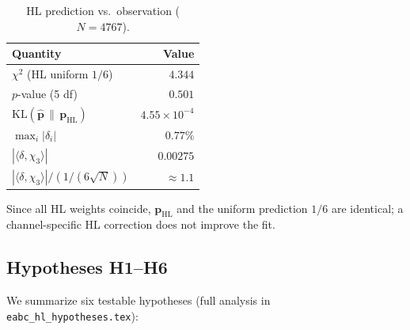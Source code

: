 \documentclass[11pt,a4paper]{article}
\begin{document}
\begin{table}[ht]
\centering
\caption{HL prediction vs.\ observation ($N=4767$).}
\label{tab:hl-goodness}
\begin{tabular}{@{}lr@{}}
\toprule
Quantity & Value \\
\midrule
$\chi^2$ (HL uniform $1/6$) & $4.344$ \\
$p$-value (5 df) & $0.501$ \\
$\mathrm{KL}(\hat{\mathbf p}\,\|\,\mathbf p_{\mathrm{HL}})$ &
$4.55\times 10^{-4}$ \\
$\max_i |\delta_i|$ & $0.77\%$ \\
$|\langle\delta,\chi_3\rangle|$ & $0.00275$ \\
$|\langle\delta,\chi_3\rangle|/(1/(6\sqrt{N}))$ & $\approx 1.1$ \\
\bottomrule
\end{tabular}
\end{table}

Since all HL weights coincide, $\mathbf p_{\mathrm{HL}}$ and the uniform
prediction $1/6$ are identical; a channel-specific HL correction does
not improve the fit.

\subsection{Hypotheses H1--H6}

We summarize six testable hypotheses
(full analysis in \texttt{eabc\_hl\_hypotheses.tex}):
\end{document}
